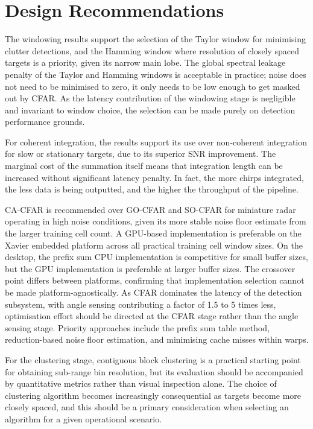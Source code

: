 \section{Design Recommendations}
The windowing results support the selection of the Taylor window for minimising 
clutter detections, and the Hamming window where resolution of closely spaced targets 
is a priority, given its narrow main lobe. The global spectral leakage penalty of
the Taylor and Hamming windows is acceptable in practice; noise does not need to be
minimised to zero, it only needs to be low enough to get masked out by CFAR.
As the latency contribution of the windowing stage is negligible and invariant to 
window choice, the selection can be made purely on detection performance grounds.

For coherent integration, the results support its use over non-coherent integration 
for slow or stationary targets, due to its superior SNR 
improvement. The marginal cost of the summation itself means that integration length can 
be increased without significant latency penalty. In fact, the more chirps 
integrated, the less data is being outputted, and the higher the throughput of the 
pipeline.

CA-CFAR is recommended over GO-CFAR and SO-CFAR for miniature radar operating in high 
noise conditions, given its more stable noise floor estimate from the larger training 
cell count. A GPU-based implementation is preferable on the Xavier embedded platform 
across all practical training cell window sizes. On the desktop, the prefix sum CPU 
implementation is competitive for small buffer sizes, but the GPU implementation is 
preferable at larger buffer sizes. The crossover point differs between platforms, 
confirming that implementation selection cannot be made platform-agnostically. As CFAR 
dominates the latency of the detection subsystem, with angle sensing contributing a 
factor of 1.5 to 5 times less, optimisation effort should be directed at the CFAR stage 
rather than the angle sensing stage. Priority approaches include the prefix sum table 
method, reduction-based noise floor estimation, and minimising cache misses within warps.

For the clustering stage, contiguous block clustering is a practical starting point for 
obtaining sub-range bin resolution, but its evaluation should be accompanied by 
quantitative metrics rather than visual inspection alone. The choice of clustering 
algorithm becomes increasingly consequential as targets become more closely spaced, and 
this should be a primary consideration when selecting an algorithm for a given operational scenario.

